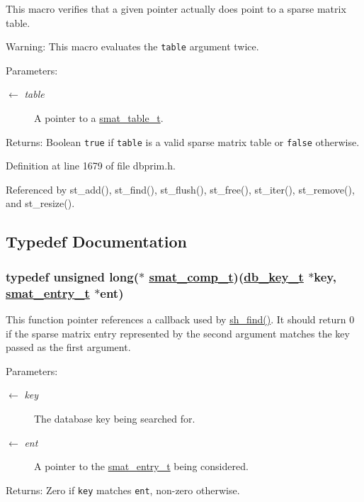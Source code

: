 This macro verifies that a given pointer actually does point to a sparse matrix table.

\begin{Desc}
\item[Warning:]This macro evaluates the {\tt table} argument twice.\end{Desc}
\begin{Desc}
\item[Parameters:]
\begin{description}
\item[\mbox{$\leftarrow$} {\em table}]A pointer to a \hyperlink{group__dbprim__smat_ga0}{smat\_\-table\_\-t}.\end{description}
\end{Desc}
\begin{Desc}
\item[Returns:]Boolean {\tt true} if {\tt table} is a valid sparse matrix table or {\tt false} otherwise.\end{Desc}


Definition at line 1679 of file dbprim.h.

Referenced by st\_\-add(), st\_\-find(), st\_\-flush(), st\_\-free(), st\_\-iter(), st\_\-remove(), and st\_\-resize().

\subsection{Typedef Documentation}
\hypertarget{group__dbprim__smat_ga5}{
\subsubsection[smat\_\-comp\_\-t]{\setlength{\rightskip}{0pt plus 5cm}typedef unsigned long($\ast$ \hyperlink{group__dbprim__smat_ga5}{smat\_\-comp\_\-t})(\hyperlink{struct__db__key__s}{db\_\-key\_\-t} $\ast$key, \hyperlink{struct__smat__entry__s}{smat\_\-entry\_\-t} $\ast$ent)}}
\label{group__dbprim__smat_ga5}


This function pointer references a callback used by \hyperlink{group__dbprim__smat_ga22}{sh\_\-find()}. It should return 0 if the sparse matrix entry represented by the second argument matches the key passed as the first argument.

\begin{Desc}
\item[Parameters:]
\begin{description}
\item[\mbox{$\leftarrow$} {\em key}]The database key being searched for. \item[\mbox{$\leftarrow$} {\em ent}]A pointer to the \hyperlink{group__dbprim__smat_ga2}{smat\_\-entry\_\-t} being considered.\end{description}
\end{Desc}
\begin{Desc}
\item[Returns:]Zero if {\tt key} matches {\tt ent}, non-zero otherwise.\end{Desc}


